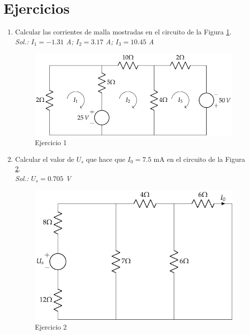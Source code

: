 \documentclass[11pt]{book} %
\begin{document}
\section{Ejercicios}
\begin{enumerate}
\item Calcular las corrientes de malla mostradas en el circuito de la Figura \ref{fig.ejercicio2_tema1}.\\
\emph{Sol.: $I_1=-1.31$ A; $I_2=3.17$ A; $I_3=10.45$ A}
		\begin{figure}[h!]
			\centering
			\includegraphics{../figs/ej2_BT1.pdf}
			\caption{Ejercicio 1}
			\label{fig.ejercicio2_tema1}
		\end{figure}
		
\item Calcular el valor de $U_s$ que hace que $I_0=7.5$ mA en el circuito de la Figura \ref{fig.ejercicio3_tema1}. \\
\emph{Sol.: $U_s=0.705$ V}    
		\begin{figure}[h!]
			\centering
			\includegraphics{../figs/ej3_BT1.pdf}
			\caption{Ejercicio 2}
			\label{fig.ejercicio3_tema1}
		\end{figure}
		

\end{enumerate}
\end{document}
